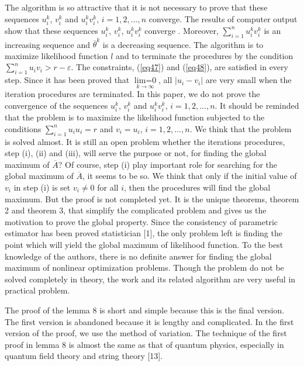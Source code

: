 \documentclass [18pt]{article}
\begin{document}
The algorithm is so attractive that it is not necessary to prove that these
sequences $u_i^k $, $v_i^k $ and $u_i^k v_i^k $, $i = 1,2,...,n$ converge.
The results of computer output show that these sequences $u_i^k $, $v_i^k $,
$u_i^k v_i^k $ converge . Moreover, $\sum\limits_{i = 1}^n {u_i^k v_i^k } $
is an increasing sequence and $\overline \theta ^k$ is a decreasing
sequence. The algorithm is to maximize likelihood function $l$ and to
terminate the procedures by the condition $\sum\limits_{i = 1}^n {u_i v_i }
> r - \varepsilon $. The constraints, (\ref{eq47}) and (\ref{eq48}), are satisfied in every
step. Since it has been proved that $\mathop {\lim w_i^k =
0}\limits_{k \to \infty } $, all $\left| {u_i - v_i } \right|$ are
very small when the iteration procedures are terminated. In this
paper, we do not prove the convergence of the sequences $u_i^k $,
$v_i^k $ and $u_i^k v_i^k $, $i = 1,2,...,n$. It should be
reminded that the problem is to maximize the likelihood function
subjected to the conditions $\sum\limits_{i = 1}^n {u_i } u_i = r$
and $v_i = u_i $, $i = 1,2,...,n$. We think that the problem is
solved almost. It is still an open problem whether the iterations
procedures, step (i), (ii) and (iii), will serve the purpose or
not, for finding the global maximum of $\overline A $? Of course,
step (i) play important role for searching for the global maximum
of $\overline A $, it seems to be so. We think that only if the
initial value of $v_i $ in step (i) is set $v_i \ne 0$ for all
$i$, then the procedures will find the global maximum. But the
proof is not completed yet. It is the unique theorems, theorem 2
and theorem 3, that simplify the complicated problem and gives us
the motivation to prove the global property. Since the consistency
of parametric estimator has been proved statistician [1], the only
problem left is finding the point which will yield the global
maximum of likelihood function. To the best knowledge of the
authors, there is no definite answer for finding the global
maximum of nonlinear optimization problems. Though the problem do
not be solved completely in theory, the work and its related
algorithm are very useful in practical problem.

The proof of the lemma 8 is short and simple because this is the final
version. The first version is abandoned because it is lengthy and
complicated. In the first version of the proof, we use the method of
variation. The technique of the first proof in lemma 8 is almost the same as
that of quantum physics, especially in quantum field theory and string
theory [13].
\end{document}
